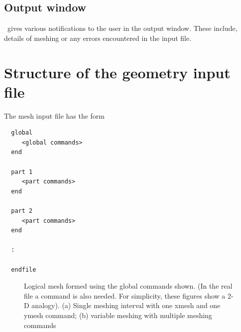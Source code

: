 \documentclass[a4paper,twoside,11pt]{book}
\begin{document}
\subsection{Output window}
\zmesh\ gives various notifications to the user in the output
window. These include, details of meshing or any errors encountered in
the input file.

\section{Structure of the geometry input file}
\label{mindesc}

The mesh input file  has the form
\begin{verbatim}
  global
     <global commands>
  end

  part 1
     <part commands>
  end

  part 2
     <part commands>
  end

  :

  endfile
\end{verbatim}

\begin{figure}
  \caption{Logical mesh formed using the global commands shown. (In the
    real file a  command is also needed. For simplicity,
    these figures show a 2-D analogy). (a) Single meshing interval with
    one xmesh and one ymesh command; (b) variable meshing with
    multiple meshing commands}
  \label{logical}
\end{figure}
\end{document}
